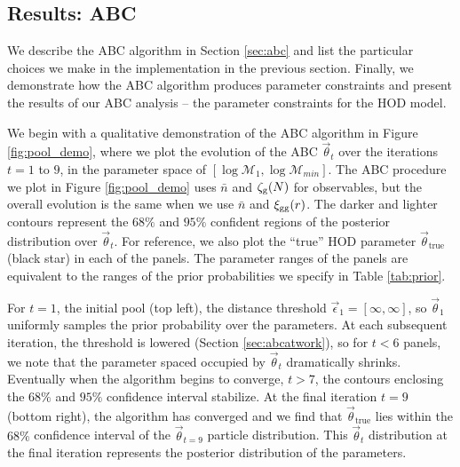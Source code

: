 \documentclass[fleqn,usenatbib]{mnras}
\newcommand{\pars}{\vec{\theta}}
\begin{document}
\subsection{Results: ABC}\label{sec:abc_results}
We describe the ABC algorithm in Section \ref{sec:abc} and list the particular choices
we make in the implementation in the previous section. Finally, we demonstrate how the 
ABC algorithm produces parameter constraints and present the results of our ABC analysis -- the 
parameter constraints for the \cite{zheng07} HOD model. 

We begin with a qualitative demonstration of the ABC algorithm in Figure \ref{fig:pool_demo},
where we plot the evolution of the ABC $\pars_t$ over the iterations $t = 1$ to $9$, 
in the parameter space of $[\log\mathcal{M}_1, \log\mathcal{M}_{min}]$. The ABC procedure we plot 
in Figure \ref{fig:pool_demo} uses $\bar{n}$ and $\mathcal{\zeta}_{\rm g}(N)$ for observables, but 
the overall evolution is the same when we use $\bar{n}$ and $\xi_{\mathrm{gg}}(r)$. The darker and lighter 
contours represent the $68\%$ and $95\%$ confident regions of the posterior distribution over $\pars_t$. For reference, we also plot the ``true'' HOD parameter $\pars_\mathrm{true}$ 
(black star) in each of the panels.
The parameter ranges of the panels are equivalent to the ranges of the prior probabilities we 
specify in Table \ref{tab:prior}. 

For $t=1$, the initial pool (top left), the distance threshold $\vec\epsilon_1 = [\infty , \infty]$, 
so $\pars_1$ uniformly samples the prior probability over the parameters.
At each subsequent iteration, the threshold is lowered (Section \ref{sec:abcatwork}), so for 
$t < 6$ panels, we note that the parameter spaced occupied by $\pars_t$ dramatically shrinks. 
Eventually when the algorithm begins to converge, $t > 7$, the contours enclosing the $68\%$ and 
$95\%$ confidence interval stabilize. At the final iteration $t=9$ (bottom right), 
the algorithm has converged and we find that 
$\pars_\mathrm{true}$ lies within the $68\%$ confidence interval of the $\pars_{t=9}$ particle 
distribution. This $\pars_t$ distribution at the final iteration represents the 
posterior distribution of the parameters. 
\end{document}

